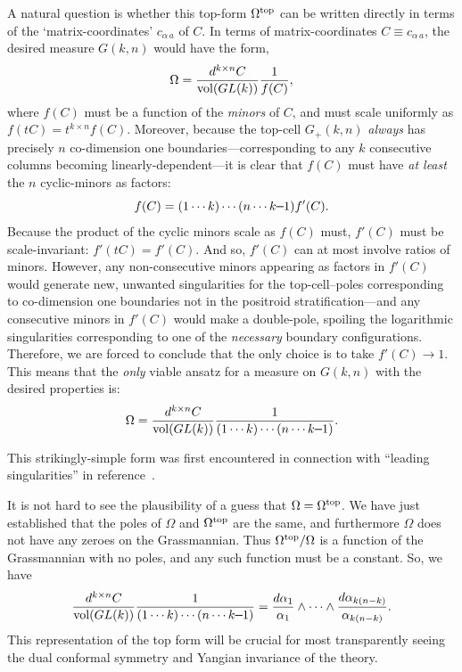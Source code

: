 \documentclass[12pt,hyperref,compress]{JHEP3}
\newcommand{\eq}[1]{\begin{equation}#1\end{equation}}
\newcommand{\mi}{{\rm\rule[2.4pt]{6pt}{0.65pt}}}
\begin{document}
{A natural question is  whether this top-form $\Omega^{{\rm top}}$ can be written directly in terms of the `matrix-coordinates' $c_{\alpha\,a}$ of $C$.
In terms of matrix-coordinates $C\equiv c_{\alpha\,a}$, the desired measure $G(k,n)$ would have the form,
\vspace{-.2cm}\eq{\Omega = \frac{d^{k\times n}C}{\mathrm{vol}(GL(k))}\frac{1}{f(C)},\vspace{-.2cm}}
where  $f(C)$ must be a function of the {\it minors} of $C$, and must scale uniformly as $f(tC)=t^{k\times n} f(C)$. Moreover, because the top-cell $G_+(k,n)$ {\it always} has precisely $n$ co-dimension one boundaries---corresponding to any $k$ consecutive columns becoming linearly-dependent---it is clear that $f(C)$ must have {\it at least} the $n$ cyclic-minors as factors:
\vspace{-.2cm}\eq{f(C)=(1\cdots k)\cdots(n\cdots k\mi1) f'(C).\vspace{-.2cm}}
Because the product of the cyclic minors scale as $f(C)$ must, $f'(C)$ must be scale-invariant: $f'(tC)=f'(C)$. And so, $f'(C)$ can at most involve ratios of minors. However, any non-consecutive minors appearing as factors in $f'(C)$ would generate new, unwanted singularities for the top-cell--poles corresponding to co-dimension one boundaries not in the positroid stratification---and any consecutive minors in $f'(C)$ would make a double-pole, spoiling the logarithmic singularities corresponding to one of the {\it necessary} boundary configurations. Therefore, we are forced to conclude that the only choice is to take $f'(C)\!\to\!1$. This means that the {\it only} viable ansatz  for a measure on $G(k,n)$ with the desired properties is:
\vspace{-.25cm}\eq{\Omega = \frac{d^{k\times n}C}{\mathrm{vol}(GL(k))}\frac{1}{(1\cdots k)\cdots(n\cdots k\mi1)}.\vspace{-.24cm}\label{cyclic_minor_top_form}}

This strikingly-simple form was first encountered in connection with ``leading singularities'' in \mbox{reference \cite{ArkaniHamed:2009dn}}.

It is not hard to see the plausibility of a guess that $\Omega = \Omega^{{\rm top}}$. We have just established that the poles of $\Omega$ and $\Omega^{{\rm top}}$ are the same, and furthermore $\Omega$ does not have any zeroes on the Grassmannian. Thus $\Omega^{{\rm top}}/\Omega$ is a function of the Grassmannian with no poles, and any such function must be a constant. So, we have
\vspace{-.3cm}\eq{\frac{d^{k\times n}C}{\mathrm{vol}(GL(k))}\frac{1}{(1\cdots k)\cdots(n\cdots k\mi1)}=\frac{d\alpha_1}{\alpha_1}\wedge\cdots\wedge\frac{d\alpha_{k(n-k)}}{\alpha_{k(n-k)}}.\vspace{-.1cm}}
This representation of the top form will be crucial for most transparently seeing the dual conformal symmetry and Yangian invariance of the theory.

}
\end{document}
